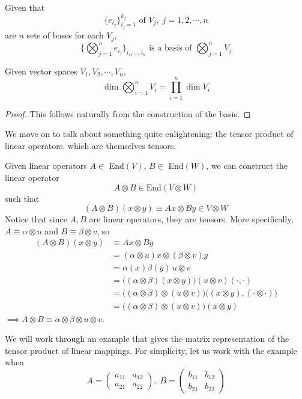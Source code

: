   \begin{definition}
    Given that 
    \[ \{ e_{i_{j}}\}_{i_{j}=1}^{k_{j}} \text{ of } V_{j},\; j = 1, 2, \cdots, n\]
    are $n$ sets of bases for each $V_{j}$, 
    \[ \{ \bigotimes_{j=1}^{n} e_{i_{j}} \}_{i_{1}, \cdots, i_{n}} \text{ is a basis of } \bigotimes_{j=1}^{n} V_{j}\]
  \end{definition}

  \begin{theorem}
    Given vector spaces $V_1, V_2, \cdots, V_n$, 
    \[ \dim \bigotimes_{i=1}^{n} V_i = \prod_{i=1}^{n} \dim V_{i}\]
  \end{theorem}
  \begin{proof}
    This follows naturally from the construction of the basis.
  \end{proof}

  We move on to talk about something quite enlightening: the tensor product of linear operators, which are themselves tensors. 

  \begin{definition}
    Given linear operators $A \in $ End$(V)$, $B \in $ End$(W)$, we can construct the linear operator 
    \[A \otimes B \in \text{End}(V \otimes W)\] 
    such that 
    \[(A \otimes B) (x \otimes y) \equiv A x \otimes B y \in V \otimes W\]
    Notice that since $A, B$ are linear operators, they are tensors. More specifically, $A \equiv \alpha \otimes u$ and $B \equiv \beta \otimes v$, so
    \begin{align*}
      (A \otimes B) (x \otimes y) & \equiv A x \otimes B y \\
      & = (\alpha \otimes u) x \otimes (\beta \otimes v) y \\
      & = \alpha (x) \beta (y) \, u \otimes v \\
      & = \big((\alpha \otimes \beta)(x \otimes y)\big) (u \otimes v)(\cdot, \cdot) \\
      & = \big((\alpha \otimes \beta) \otimes (u \otimes v)\big) \big((x \otimes y), (\cdot \otimes \cdot)\big) \\
      & = \big((\alpha \otimes \beta) \otimes (u \otimes v)\big)(x \otimes y) 
    \end{align*}
    $\implies A \otimes B \equiv \alpha \otimes \beta \otimes u \otimes v$. 
  \end{definition}

  We will work through an example that gives the matrix representation of the tensor product of linear mappings. For simplicity, let us work with the example when 
  \[A = \begin{pmatrix}
  a_{11} & a_{12} \\ a_{21} & a_{22}
  \end{pmatrix}, \; B = \begin{pmatrix}
  b_{11} & b_{12} \\ b_{21} & b_{22}
  \end{pmatrix}\]

